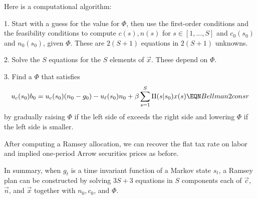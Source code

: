 Here is a computational algorithm:

\medskip

\item{1.} Start with a guess for the value for $\Phi$,  then use the first-order conditions    and the
feasibility conditions 
 to compute $c(s), n(s)$ for  $s \in [1,\ldots , S] $  and
$c_0(s_0)$ and $n_0(s_0)$, given $\Phi$.  These are $2  (S+1)$ equations in $2  (S+1)$ unknowns.

\medskip

\item{2.} Solve the $S$ equations  for the $S$ elements of $\vec x$.  These depend on $\Phi$. %

\medskip

\item{3.}  Find a $\Phi$ that satisfies
$$   u_{c}(s_0) b_0 = u_{c}(s_0) (n_0 - g_0) - u_{\ell}(s_0) n_0  + \beta \sum_{s=1}^S \Pi(s | s_0) x(s) \EQN Bellman2consr $$
 by gradually raising $\Phi$ if the
left side of   exceeds the right side  and lowering $\Phi$ if the left side is smaller.

\medskip

\noindent After computing a Ramsey allocation, we can recover the flat tax rate on labor and implied one-period Arrow securities
prices as before.

%
%



In summary,  when $g_t$ is a time invariant function of a Markov state $s_t$, a Ramsey plan can be constructed
 by solving $3S +3$ equations in $S$ components each of  $\vec c$, $\vec n$, and $\vec x$
together with
$n_0, c_0$, and $\Phi$.











